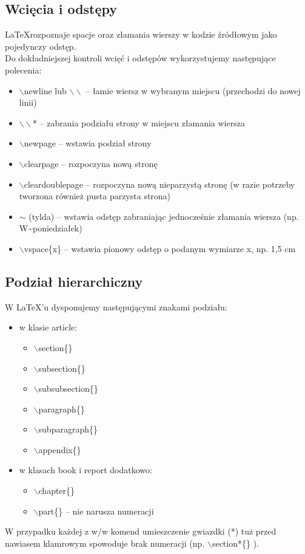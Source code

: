 \documentclass[a4paper, 12pt]{article}
\begin{document}
\subsection{Wcięcia i odstępy}
\LaTeX rozpoznaje spacje oraz złamania wierszy w kodzie źródłowym jako pojedynczy odstęp. \\
Do dokładniejszej kontroli wcięć i odstępów wykorzystujemy następujące polecenia:
\begin{itemize}
	\item $\backslash$newline lub \begin{math}\backslash\backslash\end{math} -- łamie wiersz w wybranym miejscu (przechodzi do nowej linii)
	\item \begin{math}\backslash\backslash\end{math}* -- zabrania podziału strony w miejscu złamania wiersza
	\item $\backslash$newpage -- wstawia podział strony 
	\item $\backslash$clearpage -- rozpoczyna nową stronę
	\item $\backslash$cleardoublepage -- rozpoczyna nową nieparzystą stronę (w razie potrzeby tworzona również pusta parzysta strona)
	\item $\sim$ (tylda) -- wstawia odstęp zabraniając jednocześnie złamania wiersza (np. W\~{}poniedziałek)
	\item $\backslash$vspace\{x\} -- wstawia pionowy odstęp o podanym wymiarze x, np. 1,5 cm
\end{itemize} 

\subsection{Podział hierarchiczny}
W \LaTeX 'u dysponujemy następującymi znakami podziału:
\begin{itemize}
	\item w klasie article:
	\begin{itemize}
		\item $\backslash$section\{\}
		\item $\backslash$subsection\{\}
		\item $\backslash$subsubsection\{\}
		\item $\backslash$paragraph\{\}
		\item $\backslash$subparagraph\{\}
		\item $\backslash$appendix\{\}
	\end{itemize}
	\item w klasach book i report dodatkowo:
	\begin{itemize}
		\item $\backslash$chapter\{\}
		\item $\backslash$part\{\} -- nie narusza numeracji
	\end{itemize}
\end{itemize}
W przypadku każdej z w/w komend umieszczenie gwiazdki (*) tuż przed nawiasem klamrowym spowoduje brak numeracji (np. $\backslash$section*\{\} ).
\end{document}
